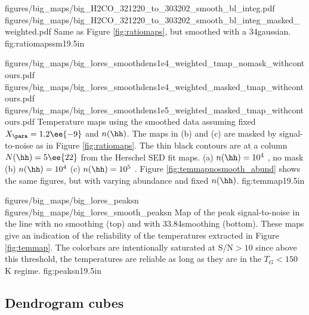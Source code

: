 \RotFigureTwoAA
{figures/big_maps/big_H2CO_321220_to_303202_smooth_bl_integ.pdf}
{figures/big_maps/big_H2CO_321220_to_303202_smooth_bl_integ_masked_weighted.pdf}
{Same as Figure \ref{fig:ratiomaps}, but smoothed with a 34\arcsec gaussian.
}
{fig:ratiomapssm}{1}{9.5in}


\RotFigureThreeAA
{figures/big_maps/big_lores_smoothdens1e4_weighted_tmap_nomask_withcontours.pdf}
{figures/big_maps/big_lores_smoothdens1e4_weighted_masked_tmap_withcontours.pdf}
{figures/big_maps/big_lores_smoothdens1e5_weighted_masked_tmap_withcontours.pdf}
{Temperature maps using the smoothed data assuming fixed $X_{\para}=1.2\ee{-9}$
and $n(\hh)$.  The maps in (b) and (c) are masked by signal-to-noise as in Figure
\ref{fig:ratiomaps}.  The thin black contours are at a column $N(\hh)=5\ee{22}$
\percc from the Herschel SED fit maps.
(a) $n(\hh) = 10^4$ \percc, no mask
(b) $n(\hh) = 10^4$ \percc
(c) $n(\hh) = 10^5$ \percc.
Figure \ref{fig:temmapnosmooth_abund} shows the same figures, but with varying
abundance and fixed $n(\hh)$.
}
{fig:temmap}{1}{9.5in}


\RotFigureTwoAA
{figures/big_maps/big_lores_peaksn}
{figures/big_maps/big_lores_smooth_peaksn}
{Map of the peak signal-to-noise in the \para \threeohthree line with no
smoothing (top) and with 33.84\arcsec smoothing (bottom).  
These maps give an indication of the reliability of the temperatures extracted
in Figure \ref{fig:temmap}.  The colorbars are intentionally saturated at
S/N$>10$ since above this threshold, the temperatures are reliable as long as
they are in the $T_G<150$ K regime.
}
{fig:peaksn}{1}{9.5in}

\subsection{Dendrogram cubes}

